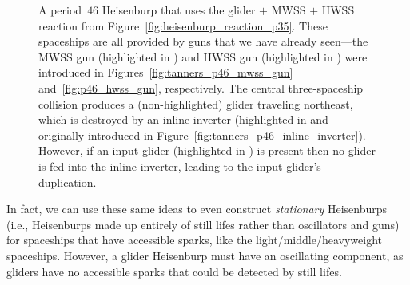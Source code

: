 \begin{figure}[!htb]
	\centering
	\caption{A period~$46$ Heisenburp that uses the glider $+$ MWSS $+$ HWSS reaction from Figure~\ref{fig:heisenburp_reaction_p35}. These spaceships are all provided by guns that we have already seen---the MWSS gun (highlighted in ) and HWSS gun (highlighted in ) were introduced in Figures~\ref{fig:tanners_p46_mwss_gun} and~\ref{fig:p46_hwss_gun}, respectively. The central three-spaceship collision produces a (non-highlighted) glider traveling northeast, which is destroyed by an inline inverter (highlighted in  and originally introduced in Figure~\ref{fig:tanners_p46_inline_inverter}). However, if an input glider (highlighted in ) is present then no glider is fed into the inline inverter, leading to the input glider's duplication.}\label{fig:p46_heisenburp_constructed}
\end{figure}

In fact, we can use these same ideas to even construct \emph{stationary} Heisenburps (i.e., Heisenburps made up entirely of still lifes rather than oscillators and guns) for spaceships that have accessible sparks, like the light/middle/heavyweight spaceships. However, a glider Heisenburp must have an oscillating component, as gliders have no accessible sparks that could be detected by still lifes.

